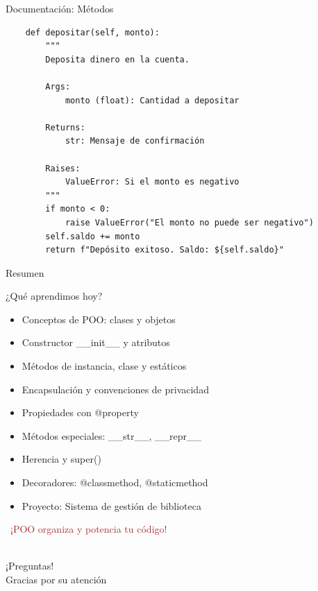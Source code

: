 \documentclass{beamer}
\begin{document}
\begin{frame}[fragile]{Documentación: Métodos \faBook}
\begin{lstlisting}
    def depositar(self, monto):
        """
        Deposita dinero en la cuenta.
        
        Args:
            monto (float): Cantidad a depositar
        
        Returns:
            str: Mensaje de confirmación
        
        Raises:
            ValueError: Si el monto es negativo
        """
        if monto < 0:
            raise ValueError("El monto no puede ser negativo")
        self.saldo += monto
        return f"Depósito exitoso. Saldo: ${self.saldo}"
\end{lstlisting}
\end{frame}

\begin{frame}{Resumen \faListUl}
\begin{conceptbox}{¿Qué aprendimos hoy?}
\small
\begin{itemize}
    \item[\faCheck] Conceptos de POO: clases y objetos
    \item[\faCheck] Constructor \_\_init\_\_ y atributos
    \item[\faCheck] Métodos de instancia, clase y estáticos
    \item[\faCheck] Encapsulación y convenciones de privacidad
    \item[\faCheck] Propiedades con @property
    \item[\faCheck] Métodos especiales: \_\_str\_\_, \_\_repr\_\_
    \item[\faCheck] Herencia y super()
    \item[\faCheck] Decoradores: @classmethod, @staticmethod
    \item[\faCheck] Proyecto: Sistema de gestión de biblioteca
\end{itemize}
\end{conceptbox}

\vspace{0.3cm}
\begin{center}
\large\textcolor{brown}{\faCube\ ¡POO organiza y potencia tu código!}
\end{center}
\end{frame}

\begin{frame}
\begin{center}
\Huge\textcolor{brown}{\faQuestionCircle}\\
\vspace{0.5cm}
\Huge ¡Preguntas!\\
\vspace{1cm}
\Large\textcolor{brownbright}{Gracias por su atención}
\end{center}
\end{frame}
\end{document}
